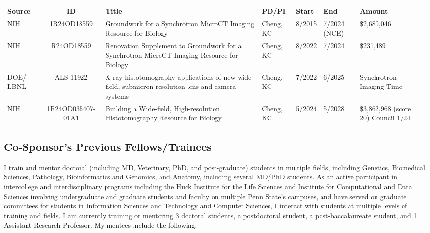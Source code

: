 \documentclass{NIHGrant}
\begin{document}
\begin{center}
\renewcommand{\arraystretch}{1.3}
  \fontsize{9pt}{9pt}\selectfont
  \begin{tabular}{| p{0.5in} | c | p{1.5in} | p{1in} | p{0.5in} | p{0.5in} | p{0.7in} |}
    \hline 
    \textbf{Source} & \textbf{ID} & \textbf{Title} & \textbf{PD/PI} & \textbf{Start} & \textbf{End} & \textbf{Amount} \\
    \hline
    NIH & 1R24OD18559 & Groundwork for a Synchrotron MicroCT Imaging Resource for Biology &  Cheng, KC & 8/2015  & 7/2024 (NCE)&\$2,680,046 \\
    \hline
    NIH & R24OD18559 & Renovation Supplement to Groundwork for a Synchrotron MicroCT Imaging Resource for Biology &  Cheng, KC & 8/2022  & 7/2024 & \$231,489 \\
    \hline
    DOE/ LBNL & ALS-11922 & X-ray histotomography applications of new wide-field, submicron resolution lens and camera systems & Cheng, KC & 7/2022 & 6/2025 & Synchrotron Imaging Time \\
    \hline 
    NIH & 1R24OD035407-01A1 & Building a Wide-field, High-resolution Histotomography Resource for Biology & Cheng, KC & 5/2024 & 5/2028 & \$3,862,968 (score 20) Council 1/24 \\
    \hline
  \end{tabular}
\end{center}

\subsection*{Co-Sponsor's Previous Fellows/Trainees}

I train and mentor doctoral (including MD, Veterinary, PhD, and post-graduate) students in multiple fields, including Genetics, Biomedical Sciences, Pathology, Bioinformatics and Genomics, and Anatomy, including several MD/PhD students. As an active participant in intercollege and interdisciplinary programs including the Huck Institute for the Life Sciences and Institute for Computational and Data Sciences involving undergraduate and graduate students and faculty on multiple Penn State's campuses, and have served on graduate committees for students in Information Sciences and Technology and Computer Sciences, I interact with students at multiple levels of training and fields.  I am currently training or mentoring 3 doctoral students, a postdoctoral student, a post-baccalaureate student, and 1 Assistant Research Professor. My mentees include the following:
\end{document}
